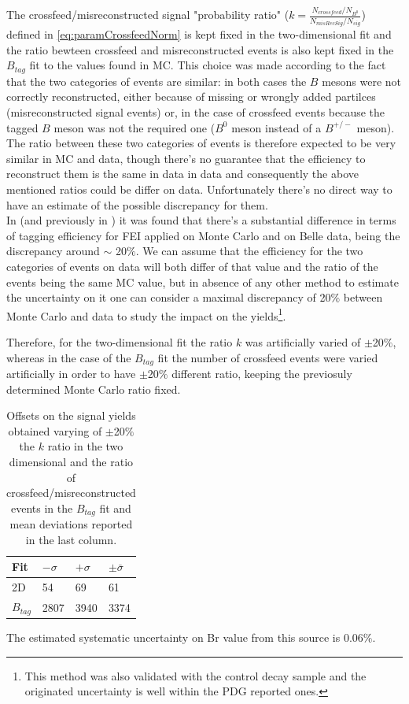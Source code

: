 The crossfeed/misreconstructed signal "probability ratio" ($k = \frac{N_{crossfeed }/  N_{B^0}}{N_{misRecSig} /  N_{sig} }$) defined in \cref{eq:paramCrossfeedNorm} is kept fixed in the two-dimensional fit and the ratio bewteen crossfeed and misreconstructed events is also kept fixed in the $B_{tag}$ fit to the values found in MC. 
This choice was made according to the fact that the two categories of events are similar: in both cases the $B$ mesons were not correctly reconstructed, either because of missing or wrongly added partilces (misreconstructed signal events) or, in the case of crossfeed events because the tagged $B$ meson was not the required one ($B^0$ meson instead of a $B^{+/-}$ meson). 
The ratio between these two categories of events is therefore expected to be very similar in MC and data, though there's no guarantee that the efficiency to reconstruct them is the same in data
in data and consequently the above mentioned ratios could be differ on data. Unfortunately there's no direct way to have an estimate of the possible discrepancy for them.\\  
In \cite{gelb_moritz_2018_21546} (and previously in \cite{schwab_judith_2017_21422}) it was found that there's a substantial difference in terms of tagging efficiency for FEI applied on Monte Carlo and on Belle data, being the discrepancy around $\sim$ 20$\%$. We can assume that the efficiency for the two categories of events on data will both differ of that value and the ratio of the events being the same MC value, but in absence of any other method to estimate the uncertainty on it one can consider a maximal discrepancy of 20$\%$ between Monte Carlo and data to study the impact on the yields\footnote{This method was also validated with the control decay sample and the originated uncertainty is well within the PDG reported ones.}. 

 Therefore, for the two-dimensional fit the ratio $k $ was artificially varied of $\pm$20$\%$, whereas in the case of the $B_{tag}$ fit the number of crossfeed events were varied artificially in order to have $\pm$20$\%$ different ratio, keeping the previosuly determined Monte Carlo ratio fixed.  
 \vspace{0.25 cm}
\begin{table}[H]
\begin{tabular}{ |p{2.5cm}||p{2cm}| p{2cm}|  p{2cm}|}
\hline
    Fit    &  $- \sigma$ &  $+ \sigma$ & $ \pm \bar{\sigma}$\\
 \hline
 2D        &     54  & 69  & 61 \\
 $B_{tag}$ &  2807 &  3940 & 3374 \\
 \hline
\end{tabular}
\caption{Offsets on the signal yields obtained varying of $\pm$20$\%$ the $k$ ratio in the two dimensional and the ratio of crossfeed/misreconstructed events in the $B_{tag}$ fit and mean deviations reported in the last column.}
\end{table}
 \vspace{0.25 cm}
The estimated systematic uncertainty on Br value from this source is 0.06$\%$. 
\vspace{0.5 cm}

